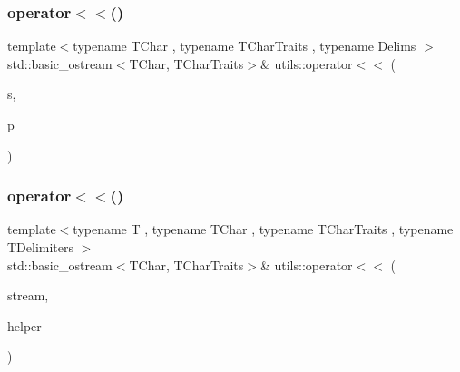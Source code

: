 \subsubsection{\texorpdfstring{operator$<$$<$()}{operator<<()}\hspace{0.1cm}{\footnotesize\ttfamily [1/2]}}
{\footnotesize\ttfamily template$<$typename T\+Char , typename T\+Char\+Traits , typename Delims $>$ \\
std\+::basic\+\_\+ostream$<$T\+Char, T\+Char\+Traits$>$\& utils\+::operator$<$$<$ (\begin{DoxyParamCaption}\item[{std\+::basic\+\_\+ostream$<$ T\+Char, T\+Char\+Traits $>$ \&}]{s,  }\item[{const \mbox{\hyperlink{structutils_1_1custom__delims}{custom\+\_\+delims}}$<$ Delims $>$ \&}]{p }\end{DoxyParamCaption})\hspace{0.3cm}{\ttfamily [inline]}}

\mbox{\label{namespaceutils_ae2340b0fc8a712051acfd8f2fc1fc661}} 
\subsubsection{\texorpdfstring{operator$<$$<$()}{operator<<()}\hspace{0.1cm}{\footnotesize\ttfamily [2/2]}}
{\footnotesize\ttfamily template$<$typename T , typename T\+Char , typename T\+Char\+Traits , typename T\+Delimiters $>$ \\
std\+::basic\+\_\+ostream$<$T\+Char, T\+Char\+Traits$>$\& utils\+::operator$<$$<$ (\begin{DoxyParamCaption}\item[{std\+::basic\+\_\+ostream$<$ T\+Char, T\+Char\+Traits $>$ \&}]{stream,  }\item[{const \mbox{\hyperlink{structutils_1_1print__container__helper}{print\+\_\+container\+\_\+helper}}$<$ T, T\+Char, T\+Char\+Traits, T\+Delimiters $>$ \&}]{helper }\end{DoxyParamCaption})\hspace{0.3cm}{\ttfamily [inline]}}

\mbox{\label{namespaceutils_afcac2dfc0ae32f7465fafd54d96d8bf5}} 
